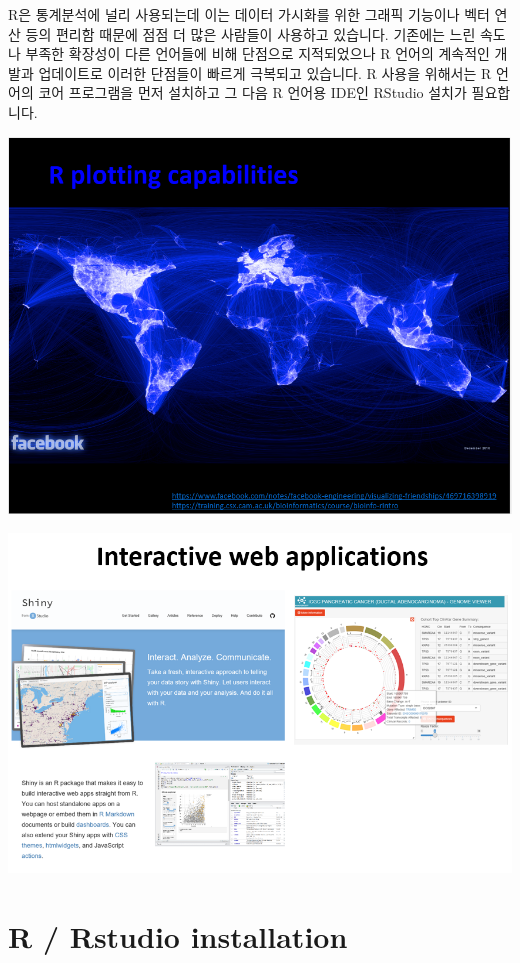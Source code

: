 \documentclass[
]{book}
\begin{document}
R은 통계분석에 널리 사용되는데 이는 데이터 가시화를 위한 그래픽 기능이나 벡터 연산 등의 편리함 때문에 점점 더 많은 사람들이 사용하고 있습니다. 기존에는 느린 속도나 부족한 확장성이 다른 언어들에 비해 단점으로 지적되었으나 R 언어의 계속적인 개발과 업데이트로 이러한 단점들이 빠르게 극복되고 있습니다. R 사용을 위해서는 R 언어의 코어 프로그램을 먼저 설치하고 그 다음 R 언어용 IDE인 RStudio 설치가 필요합니다.

\includegraphics{images/01/22.PNG}

\includegraphics{images/01/23.PNG}

\hypertarget{r-rstudio-installation}{%
\section{R / Rstudio installation}\label{r-rstudio-installation}}
\end{document}
